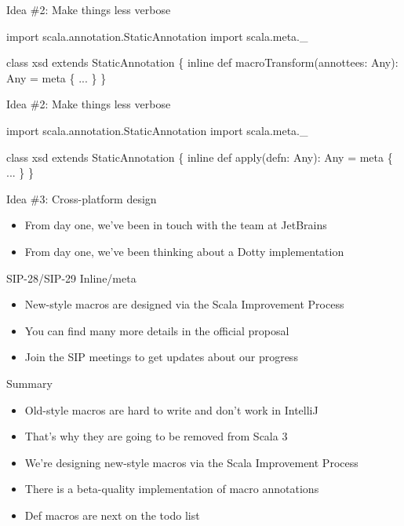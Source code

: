 \documentclass[svgnames,dvipsnames,hyperref={bookmarks=false},usepdftitle=false]{beamer}
\begin{document}
\begin{frame}[fragile]{Idea \#2: Make things less verbose}
\begin{semiverbatim}
import scala.annotation.StaticAnnotation
import scala.meta._

class xsd extends StaticAnnotation \{
  \alert{inline} def macroTransform(annottees: Any): Any = \alert{meta} \{
    ...
  \}
\}
\end{semiverbatim}
\end{frame}

\begin{frame}[fragile]{Idea \#2: Make things less verbose}
\begin{semiverbatim}
import scala.annotation.StaticAnnotation
import scala.meta._

class xsd extends StaticAnnotation \{
  inline def \alert{apply}(defn: Any): Any = meta \{
    ...
  \}
\}
\end{semiverbatim}
\end{frame}

\begin{frame}{Idea \#3: Cross-platform design}
\begin{itemize}
\item From day one, we've been in touch with the team at JetBrains
\item From day one, we've been thinking about a Dotty implementation
\end{itemize}
\end{frame}

\begin{frame}{SIP-28/SIP-29 Inline/meta}
\begin{itemize}
\item New-style macros are designed via the Scala Improvement Process
\item You can find many more details in the official proposal
\item Join the SIP meetings to get updates about our progress
\end{itemize}
\end{frame}



\begin{frame}{Summary}
\begin{itemize}
\item Old-style macros are hard to write and don't work in IntelliJ
\item That's why they are going to be removed from Scala 3
\item We're designing new-style macros via the Scala Improvement Process
\item There is a beta-quality implementation of macro annotations
\item Def macros are next on the todo list
\end{itemize}
\end{frame}
\end{document}

